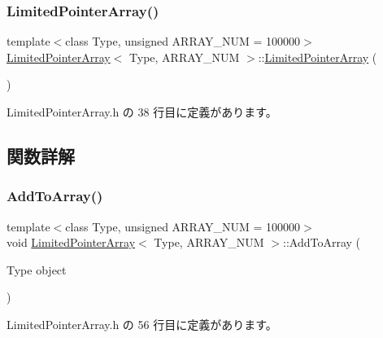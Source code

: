 \subsubsection{\texorpdfstring{Limited\+Pointer\+Array()}{LimitedPointerArray()}}
{\footnotesize\ttfamily template$<$class Type, unsigned A\+R\+R\+A\+Y\+\_\+\+N\+UM = 100000$>$ \\
\mbox{\hyperlink{class_limited_pointer_array}{Limited\+Pointer\+Array}}$<$ Type, A\+R\+R\+A\+Y\+\_\+\+N\+UM $>$\+::\mbox{\hyperlink{class_limited_pointer_array}{Limited\+Pointer\+Array}} (\begin{DoxyParamCaption}{ }\end{DoxyParamCaption})\hspace{0.3cm}{\ttfamily [inline]}}



 Limited\+Pointer\+Array.\+h の 38 行目に定義があります。



\subsection{関数詳解}
\mbox{\label{class_limited_pointer_array_a57eb08357204668710021965425f4f46}} 
\subsubsection{\texorpdfstring{Add\+To\+Array()}{AddToArray()}}
{\footnotesize\ttfamily template$<$class Type, unsigned A\+R\+R\+A\+Y\+\_\+\+N\+UM = 100000$>$ \\
void \mbox{\hyperlink{class_limited_pointer_array}{Limited\+Pointer\+Array}}$<$ Type, A\+R\+R\+A\+Y\+\_\+\+N\+UM $>$\+::Add\+To\+Array (\begin{DoxyParamCaption}\item[{Type}]{object }\end{DoxyParamCaption})\hspace{0.3cm}{\ttfamily [inline]}}



 Limited\+Pointer\+Array.\+h の 56 行目に定義があります。

\mbox{\label{class_limited_pointer_array_a02cfaed541d27980883ec9eb90ad3813}} 
